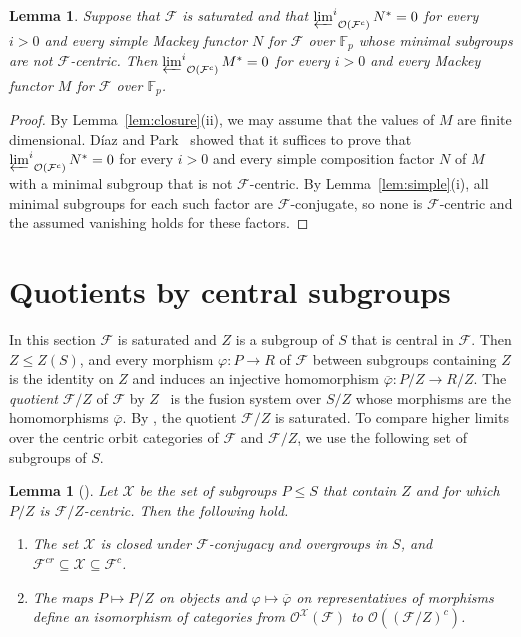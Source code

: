 \documentclass[10pt]{amsart}
\newtheorem{lemma}[theorem]{Lemma}
\theoremstyle{definition}
\numberwithin{equation}{section}
\renewcommand{\le}{\leqslant}
\newcommand{\F}{\mathcal F}
\newcommand{\Op}{\mathcal O}
\newcommand{\limi}[2]{\mathop{\varprojlim\nolimits^{#1}}_{#2}}
\begin{document}
\begin{lemma}\label{lem:reduction}
Suppose that $\F$ is saturated and that $\limi{i}{\Op(\F^c)}N^*=0$ for every $i>0$ and every simple Mackey functor $N$ for $\F$ over $\mathbb{F}_p$ whose minimal subgroups are not $\F$-centric. Then $\limi{i}{\Op(\F^c)}M^*=0$ for every $i>0$ and every Mackey functor $M$ for $\F$ over $\mathbb{F}_p$.
\end{lemma}

\begin{proof}
By Lemma~\ref{lem:closure}(ii), we may assume that the values of $M$ are finite dimensional. D\'iaz and Park~\cite[Proposition~4.3]{DP} showed that it suffices to prove that $\limi{i}{\Op(\F^c)}N^*=0$ for every $i>0$ and every simple composition factor $N$ of $M$ with a minimal subgroup that is not $\F$-centric. By Lemma~\ref{lem:simple}(i), all minimal subgroups for each such factor are $\F$-conjugate, so none is $\F$-centric and the assumed vanishing holds for these factors.
\end{proof}
\section{Quotients by central subgroups}
In this section $\F$ is saturated and $Z$ is a subgroup of $S$ that is central in $\F$. Then $Z\le Z(S)$, and every morphism $\varphi\colon P\to R$ of $\F$ between subgroups containing $Z$ is the identity on $Z$ and induces an injective homomorphism $\overline\varphi\colon P/Z\to R/Z$. The \emph{quotient} $\F/Z$ of $\F$ by $Z$~\cite[Definition~II.5.3]{AKO} is the fusion system over $S/Z$ whose morphisms are the homomorphisms $\overline\varphi$. By \cite[Lemma~II.5.5]{AKO}, the quotient $\F/Z$ is saturated. To compare higher limits over the centric orbit categories of $\F$ and $\F/Z$, we use the following set of subgroups of $S$.

\begin{lemma}[\cite{BCGLO}]\label{lem:quotient-collection}
Let $\mathcal X$ be the set of subgroups $P\le S$ that contain $Z$ and for which $P/Z$ is $\F/Z$-centric. Then the following hold.
\begin{enumerate}[label=\textup{(\roman*)}]
\item The set $\mathcal X$ is closed under $\F$-conjugacy and overgroups in $S$, and $\F^{cr}\subseteq\mathcal X\subseteq\F^c$.
\item The maps $P\mapsto P/Z$ on objects and $\varphi\mapsto\overline\varphi$ on representatives of morphisms define an isomorphism of categories from $\Op^{\mathcal X}(\F)$ to $\Op((\F/Z)^c)$.
\end{enumerate}
\end{lemma}
\end{document}
